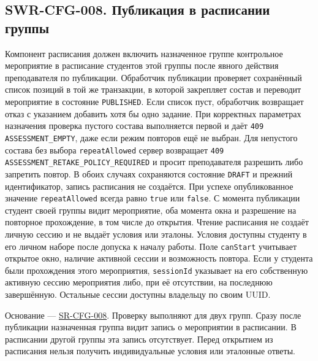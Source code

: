 \documentclass[12pt,a4paper]{article}
\begin{document}
\subsection{SWR-CFG-008. Публикация в расписании группы}\label{swr-cfg-008-ux43fux443ux431ux43bux438ux43aux430ux446ux438ux44f-ux432-ux440ux430ux441ux43fux438ux441ux430ux43dux438ux438-ux433ux440ux443ux43fux43fux44b}

\hypertarget{swr-cfg-008-публикация-в-расписании-группы}{}

\hypertarget{swr-cfg-008}{}

Компонент расписания должен включить назначенное группе контрольное мероприятие в расписание студентов этой группы после явного действия преподавателя по публикации. Обработчик публикации проверяет сохранённый список позиций в той же транзакции, в которой закрепляет состав и переводит мероприятие в состояние \texttt{PUBLISHED}. Если список пуст, обработчик возвращает отказ с указанием добавить хотя бы одно задание. При корректных параметрах назначения проверка пустого состава выполняется первой и даёт \texttt{409 ASSESSMENT\_\allowbreak{}EMPTY}, даже если режим повторов ещё не выбран. Для непустого состава без выбора \texttt{repeat\allowbreak{}Allowed} сервер возвращает \texttt{409 ASSESSMENT\_\allowbreak{}RETAKE\_\allowbreak{}POLICY\_\allowbreak{}REQUIRED} и просит преподавателя разрешить либо запретить повтор. В обоих случаях сохраняются состояние \texttt{DRAFT} и прежний идентификатор, запись расписания не создаётся. При успехе опубликованное значение \texttt{repeat\allowbreak{}Allowed} всегда равно \texttt{true} или \texttt{false}. С момента публикации студент своей группы видит мероприятие, оба момента окна и разрешение на повторное прохождение, в том числе до открытия. Чтение расписания не создаёт личную сессию и не выдаёт условия или эталоны. Условия доступны студенту в его личном наборе после допуска к началу работы. Поле \texttt{canStart} учитывает открытое окно, наличие активной сессии и возможность повтора. Если у студента были прохождения этого мероприятия, \texttt{sessionId} указывает на его собственную активную сессию мероприятия либо, при её отсутствии, на последнюю завершённую. Остальные сессии доступны владельцу по своим UUID.

Основание --- {\href{../04\_Системные\_требования/DOC-05\_Системные\_требования.pdf\#sr-cfg-008}{SR-CFG-008}}. Проверку выполняют для двух групп. Сразу после публикации назначенная группа видит запись о мероприятии в расписании. В расписании другой группы эта запись отсутствует. Перед открытием из расписания нельзя получить индивидуальные условия или эталонные ответы.
\end{document}
